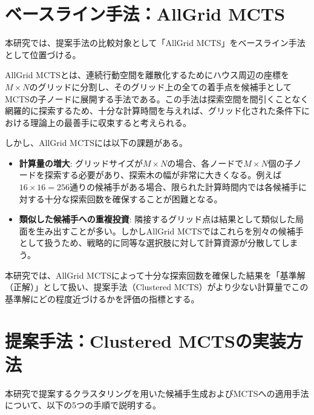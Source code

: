 \documentclass[11pt,a4j]{jreport}
\begin{document}
\section[AllGrid MCTS]{ベースライン手法：AllGrid MCTS}
本研究では、提案手法の比較対象として「AllGrid MCTS」をベースライン手法として位置づける。

AllGrid MCTSとは、連続行動空間を離散化するためにハウス周辺の座標を$M \times N$のグリッドに分割し、そのグリッド上の全ての着手点を候補手としてMCTSの子ノードに展開する手法である。この手法は探索空間を間引くことなく網羅的に探索するため、十分な計算時間を与えれば、グリッド化された条件下における理論上の最善手に収束すると考えられる。

しかし、AllGrid MCTSには以下の課題がある。
\begin{itemize}
    \item \textbf{計算量の増大}: グリッドサイズが$M \times N$の場合、各ノードで$M \times N$個の子ノードを探索する必要があり、探索木の幅が非常に大きくなる。例えば$16 \times 16 = 256$通りの候補手がある場合、限られた計算時間内では各候補手に対する十分な探索回数を確保することが困難となる。
    \item \textbf{類似した候補手への重複投資}: 隣接するグリッド点は結果として類似した局面を生み出すことが多い。しかしAllGrid MCTSではこれらを別々の候補手として扱うため、戦略的に同等な選択肢に対して計算資源が分散してしまう。
\end{itemize}

本研究では、AllGrid MCTSによって十分な探索回数を確保した結果を「基準解（正解）」として扱い、提案手法（Clustered MCTS）がより少ない計算量でこの基準解にどの程度近づけるかを評価の指標とする。

\section[Clustered MCTSの実装]{提案手法：Clustered MCTSの実装方法}
本研究で提案するクラスタリングを用いた候補手生成およびMCTSへの適用手法について、以下の5つの手順で説明する。
\end{document}
